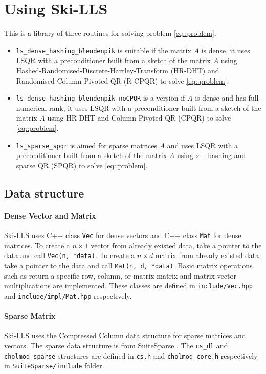 \documentclass[english,11pt]{article}
\begin{document}
\section{Using Ski-LLS}

This is a library of three routines for solving problem \eqref{eq::problem}. 

\begin{itemize}
	\item {\tt ls_dense_hashing_blendenpik} is suitable if the matrix $A$ is dense, it uses LSQR with a preconditioner built from a sketch of the matrix $A$ using Hashed-Randomised-Discrete-Hartley-Transform (HR-DHT) and Randomised-Column-Pivoted-QR (R-CPQR) to solve \eqref{eq::problem}.

	\item {\tt ls_dense_hashing_blendenpik_noCPQR} is a version if $A$ is dense and has full numerical rank, it uses LSQR with a preconditioner built from a sketch of the matrix $A$ using HR-DHT and Column-Pivoted-QR (CPQR) to solve \eqref{eq::problem}.

	\item {\tt ls_sparse_spqr} is aimed for sparse matrices $A$ and uses LSQR with a preconditioner built from a sketch of the matrix $A$ using $s-$hashing and sparse QR (SPQR) to solve \eqref{eq::problem}.
\end{itemize}

\subsection{Data structure}

\paragraph{Dense Vector and Matrix}
Ski-LLS uses C++ class {\tt Vec} for dense vectors and C++ class {\tt Mat} for dense matrices. 
To create a $n\times 1$ vector from already existed data, take a pointer to the data and call {\tt Vec(n, *data)}. 
To create a $n \times d$ matrix from already existed data, take a pointer to the data and call {\tt Mat(n, d, *data)}. Basic matrix operations such as return a specific row, column, or matrix-matrix and matrix vector multiplications are implemented.  
These classes are defined in {\tt include/Vec.hpp} and {\tt include/impl/Mat.hpp} respectively. 


\paragraph{Sparse Matrix}
Ski-LLS uses the Compressed Column data structure for sparse matrices and vectors. The sparse data structure is from SuiteSparse \cite{Davis:2011ft}. The {\tt cs_dl} and {\tt cholmod_sparse} structures are defined in {\tt cs.h} and {\tt cholmod_core.h} respectively in {\tt SuiteSparse/include} folder. 
\end{document}
